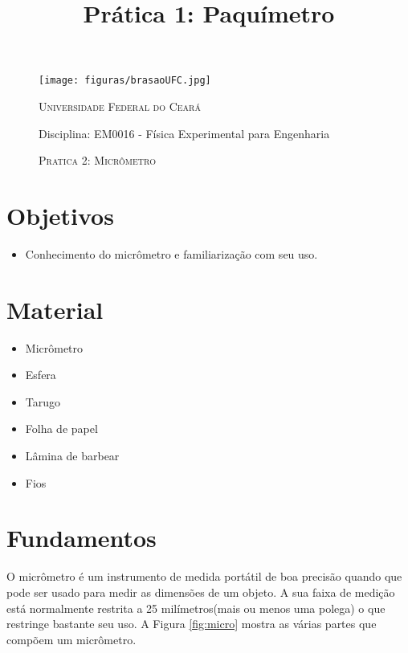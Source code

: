 \documentclass[10pt,a4paper,onecolumn,notitlepage]{scrartcl}
\author{}
\title{Prática 1: Paquímetro}
\begin{document}
\thispagestyle{myheadings}

\begin{figure}
\begin{minipage}{0.08\linewidth}
\texttt{[image: figuras/brasaoUFC.jpg]} 
\end{minipage}
\begin{minipage}{0.91\linewidth}
\textsc{Universidade Federal do Ceará}

Disciplina: EM0016 - Física Experimental para Engenharia
\end{minipage}

\begin{minipage}{\linewidth}
\centering
\textsc{Pratica 2: Micrômetro}
\\
\hrulefill %
\end{minipage}
\end{figure}

\section{Objetivos}

\begin{itemize}
\item Conhecimento do micrômetro e familiarização com seu uso.
\end{itemize}

\section{Material}

\begin{multicols}{3}
\begin{itemize}
\item Micrômetro
\item Esfera
\item Tarugo
\item Folha de papel
\item Lâmina de barbear
\item Fios
\end{itemize}
\end{multicols}

\section{Fundamentos}
O micrômetro é um instrumento de medida portátil de boa precisão quando que pode ser usado para medir as dimensões de um objeto. A sua faixa de medição está normalmente restrita a 25 milímetros(mais ou menos uma polega) o que restringe bastante seu uso. A Figura \ref{fig:micro} mostra as várias partes que compõem um micrômetro.
\end{document}
